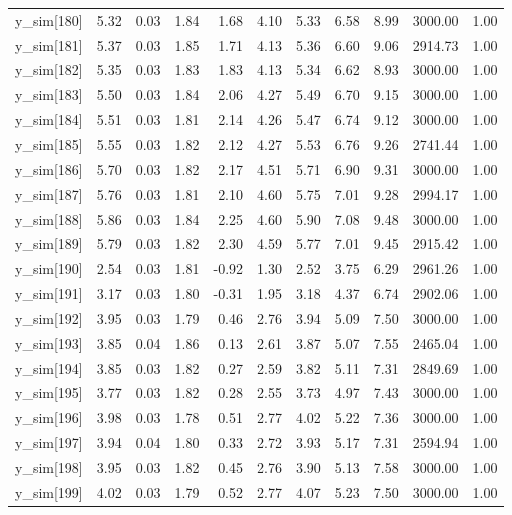 \begin{table}[ht]
\begin{tabular}{rrrrrrrrrrr}
  y\_sim[180] & 5.32 & 0.03 & 1.84 & 1.68 & 4.10 & 5.33 & 6.58 & 8.99 & 3000.00 & 1.00 \\ 
  y\_sim[181] & 5.37 & 0.03 & 1.85 & 1.71 & 4.13 & 5.36 & 6.60 & 9.06 & 2914.73 & 1.00 \\ 
  y\_sim[182] & 5.35 & 0.03 & 1.83 & 1.83 & 4.13 & 5.34 & 6.62 & 8.93 & 3000.00 & 1.00 \\ 
  y\_sim[183] & 5.50 & 0.03 & 1.84 & 2.06 & 4.27 & 5.49 & 6.70 & 9.15 & 3000.00 & 1.00 \\ 
  y\_sim[184] & 5.51 & 0.03 & 1.81 & 2.14 & 4.26 & 5.47 & 6.74 & 9.12 & 3000.00 & 1.00 \\ 
  y\_sim[185] & 5.55 & 0.03 & 1.82 & 2.12 & 4.27 & 5.53 & 6.76 & 9.26 & 2741.44 & 1.00 \\ 
  y\_sim[186] & 5.70 & 0.03 & 1.82 & 2.17 & 4.51 & 5.71 & 6.90 & 9.31 & 3000.00 & 1.00 \\ 
  y\_sim[187] & 5.76 & 0.03 & 1.81 & 2.10 & 4.60 & 5.75 & 7.01 & 9.28 & 2994.17 & 1.00 \\ 
  y\_sim[188] & 5.86 & 0.03 & 1.84 & 2.25 & 4.60 & 5.90 & 7.08 & 9.48 & 3000.00 & 1.00 \\ 
  y\_sim[189] & 5.79 & 0.03 & 1.82 & 2.30 & 4.59 & 5.77 & 7.01 & 9.45 & 2915.42 & 1.00 \\ 
  y\_sim[190] & 2.54 & 0.03 & 1.81 & -0.92 & 1.30 & 2.52 & 3.75 & 6.29 & 2961.26 & 1.00 \\ 
  y\_sim[191] & 3.17 & 0.03 & 1.80 & -0.31 & 1.95 & 3.18 & 4.37 & 6.74 & 2902.06 & 1.00 \\ 
  y\_sim[192] & 3.95 & 0.03 & 1.79 & 0.46 & 2.76 & 3.94 & 5.09 & 7.50 & 3000.00 & 1.00 \\ 
  y\_sim[193] & 3.85 & 0.04 & 1.86 & 0.13 & 2.61 & 3.87 & 5.07 & 7.55 & 2465.04 & 1.00 \\ 
  y\_sim[194] & 3.85 & 0.03 & 1.82 & 0.27 & 2.59 & 3.82 & 5.11 & 7.31 & 2849.69 & 1.00 \\ 
  y\_sim[195] & 3.77 & 0.03 & 1.82 & 0.28 & 2.55 & 3.73 & 4.97 & 7.43 & 3000.00 & 1.00 \\ 
  y\_sim[196] & 3.98 & 0.03 & 1.78 & 0.51 & 2.77 & 4.02 & 5.22 & 7.36 & 3000.00 & 1.00 \\ 
  y\_sim[197] & 3.94 & 0.04 & 1.80 & 0.33 & 2.72 & 3.93 & 5.17 & 7.31 & 2594.94 & 1.00 \\ 
  y\_sim[198] & 3.95 & 0.03 & 1.82 & 0.45 & 2.76 & 3.90 & 5.13 & 7.58 & 3000.00 & 1.00 \\ 
  y\_sim[199] & 4.02 & 0.03 & 1.79 & 0.52 & 2.77 & 4.07 & 5.23 & 7.50 & 3000.00 & 1.00 \\ 

\end{tabular}
\end{table}
